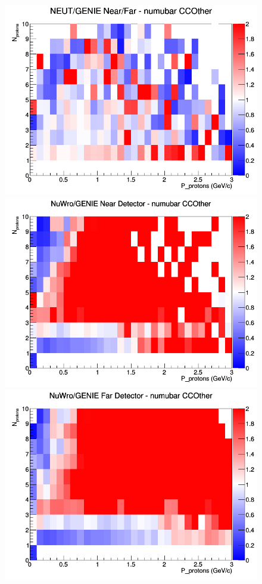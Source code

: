 \begin{figure}[h]
\endminipage
{}
\includegraphics[width=\linewidth]{N_P/nominal/protons/ratios/CCOther_NEUT_GENIE_numubar_NF_N_P.png}
\endminipage
\newline
{}
\includegraphics[width=\linewidth]{N_P/nominal/protons/ratios/CCOther_NuWro_GENIE_numubar_near_N_P.png}
\endminipage
{}
\includegraphics[width=\linewidth]{N_P/nominal/protons/ratios/CCOther_NuWro_GENIE_numubar_far_N_P.png}

\end{figure}
